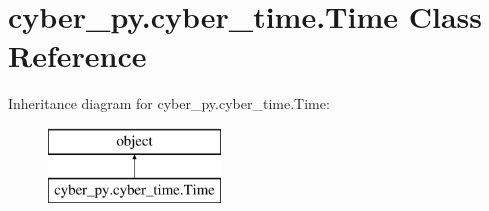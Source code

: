\hypertarget{classcyber__py_1_1cyber__time_1_1Time}{\section{cyber\-\_\-py.\-cyber\-\_\-time.\-Time Class Reference}
\label{classcyber__py_1_1cyber__time_1_1Time}
}
Inheritance diagram for cyber\-\_\-py.\-cyber\-\_\-time.\-Time\-:\begin{figure}[H]
\begin{center}
\leavevmode
\includegraphics[height=2.000000cm]{classcyber__py_1_1cyber__time_1_1Time}
\end{center}
\end{figure}
